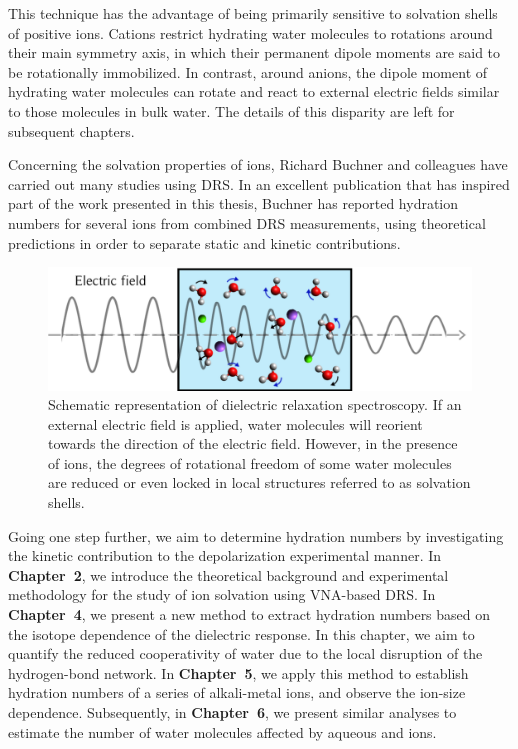 This technique has the advantage of being primarily sensitive to solvation shells of positive ions. Cations restrict hydrating water molecules to rotations around their main symmetry axis, in which their permanent dipole moments are said to be rotationally immobilized. In contrast, around anions, the dipole moment of hydrating water molecules can rotate and react to external electric fields similar to those molecules in bulk water. The details of this disparity are left for subsequent chapters.


Concerning the solvation properties of ions, Richard Buchner and colleagues have carried out many studies using DRS.\!\cite{Buchner1999b,Buchner1999,Buchner1999c,Chen2003,Buchner2004a,Chen2005,Wachter2005,Wachter2007,Schrodle2007,Hunger2009,Tielrooij2010a,Rahman2012} In an excellent publication that has inspired part of the work presented in this thesis, Buchner has reported hydration numbers for several ions from combined DRS measurements, using theoretical predictions in order to separate static and kinetic contributions.\!\cite{Buchner2008}



\begin{figure}[t!]
	\centering
	\includegraphics[width=0.85\figwidth]{chapters/Chapter1_Introduction/Graphs/DRS_Concept1.png} %
	\caption{Schematic representation of dielectric relaxation spectroscopy. If an external electric field is applied, water molecules will reorient towards the direction of the electric field. However, in the presence of ions, the degrees of rotational freedom of some water molecules are reduced or even locked in local structures referred to as solvation shells.}
	\label{DRSSchematic}
\end{figure}



Going one step further, we aim to determine hydration numbers by investigating the kinetic contribution to the depolarization experimental manner. In \textbf{Chapter~2}, we introduce the theoretical background and experimental methodology for the study of ion solvation using VNA-based DRS. In \textbf{Chapter~4}, we present a new method to extract hydration numbers based on the isotope dependence of the dielectric response. In this chapter, we aim to quantify the reduced cooperativity of water due to the local disruption  of the hydrogen-bond network. In \textbf{Chapter~5}, we apply this method to establish hydration numbers of a series of alkali-metal ions, and observe the ion-size dependence. Subsequently, in \textbf{Chapter~6}, we present similar analyses to estimate the number of water molecules affected by aqueous  and  ions.



